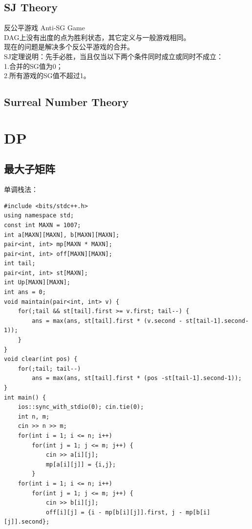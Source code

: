 \documentclass[10pt]{ctexart}
\begin{document}
{\subsection{SJ Theory}
反公平游戏 Anti-SG Game\\
DAG上没有出度的点为胜利状态，其它定义与一般游戏相同。\\
现在的问题是解决多个反公平游戏的合并。\\
SJ定理说明：先手必胜，当且仅当以下两个条件同时成立或同时不成立：\\
1.合并的SG值为0；\\
2.所有游戏的SG值不超过1。\\
\subsection{Surreal Number Theory}


\newpage
\section{DP}
\subsection{最大子矩阵}
单调栈法：
\begin{lstlisting}
#include <bits/stdc++.h>
using namespace std;
const int MAXN = 1007;
int a[MAXN][MAXN], b[MAXN][MAXN];
pair<int, int> mp[MAXN * MAXN];
pair<int, int> off[MAXN][MAXN];
int tail;
pair<int, int> st[MAXN];
int Up[MAXN][MAXN];
int ans = 0;
void maintain(pair<int, int> v) {
    for(;tail && st[tail].first >= v.first; tail--) {
        ans = max(ans, st[tail].first * (v.second - st[tail-1].second-1));
    }
}
void clear(int pos) {
    for(;tail; tail--)
        ans = max(ans, st[tail].first * (pos -st[tail-1].second-1));
}
int main() {
    ios::sync_with_stdio(0); cin.tie(0);
    int n, m;
    cin >> n >> m;
    for(int i = 1; i <= n; i++)
        for(int j = 1; j <= m; j++) {
            cin >> a[i][j];
            mp[a[i][j]] = {i,j};
        }
    for(int i = 1; i <= n; i++)
        for(int j = 1; j <= m; j++) {
            cin >> b[i][j];
            off[i][j] = {i - mp[b[i][j]].first, j - mp[b[i][j]].second};


\end{lstlisting}}
\end{document}
